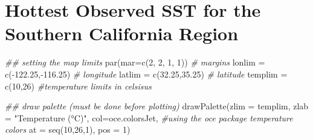 \documentclass[]{tufte-handout}
\newenvironment{Shaded}{}{}
\newcommand{\AttributeTok}[1]{\textcolor[rgb]{0.49,0.56,0.16}{#1}}
\newcommand{\CommentTok}[1]{\textcolor[rgb]{0.38,0.63,0.69}{\textit{#1}}}
\newcommand{\DecValTok}[1]{\textcolor[rgb]{0.25,0.63,0.44}{#1}}
\newcommand{\DocumentationTok}[1]{\textcolor[rgb]{0.73,0.13,0.13}{\textit{#1}}}
\newcommand{\FloatTok}[1]{\textcolor[rgb]{0.25,0.63,0.44}{#1}}
\newcommand{\FunctionTok}[1]{\textcolor[rgb]{0.02,0.16,0.49}{#1}}
\newcommand{\NormalTok}[1]{#1}
\newcommand{\OtherTok}[1]{\textcolor[rgb]{0.00,0.44,0.13}{#1}}
\newcommand{\SpecialCharTok}[1]{\textcolor[rgb]{0.25,0.44,0.63}{#1}}
\newcommand{\StringTok}[1]{\textcolor[rgb]{0.25,0.44,0.63}{#1}}
\begin{document}
\hypertarget{hottest-observed-sst-for-the-southern-california-region}{%
\section{Hottest Observed SST for the Southern California
Region}\label{hottest-observed-sst-for-the-southern-california-region}}

\begin{Shaded}
\begin{Highlighting}[]
\DocumentationTok{\#\# setting the map limits}
\FunctionTok{par}\NormalTok{(}\AttributeTok{mar=}\FunctionTok{c}\NormalTok{(}\DecValTok{2}\NormalTok{, }\DecValTok{2}\NormalTok{, }\DecValTok{1}\NormalTok{, }\DecValTok{1}\NormalTok{)) }\CommentTok{\# margins}
\NormalTok{lonlim }\OtherTok{=} \FunctionTok{c}\NormalTok{(}\SpecialCharTok{{-}}\FloatTok{122.25}\NormalTok{,}\SpecialCharTok{{-}}\FloatTok{116.25}\NormalTok{) }\CommentTok{\# longitude}
\NormalTok{latlim }\OtherTok{=} \FunctionTok{c}\NormalTok{(}\FloatTok{32.25}\NormalTok{,}\FloatTok{35.25}\NormalTok{) }\CommentTok{\# latitude}
\NormalTok{templim }\OtherTok{=} \FunctionTok{c}\NormalTok{(}\DecValTok{10}\NormalTok{,}\DecValTok{26}\NormalTok{) }\CommentTok{\#temperature limits in celsisus}

\DocumentationTok{\#\# draw palette (must be done before plotting)}
\FunctionTok{drawPalette}\NormalTok{(}\AttributeTok{zlim =}\NormalTok{ templim, }
            \AttributeTok{zlab =} \StringTok{"Temperature (°C)"}\NormalTok{,}
            \AttributeTok{col=}\NormalTok{oce.colorsJet, }\CommentTok{\#using the oce package temperature colors}
            \AttributeTok{at =} \FunctionTok{seq}\NormalTok{(}\DecValTok{10}\NormalTok{,}\DecValTok{26}\NormalTok{,}\DecValTok{1}\NormalTok{), }
            \AttributeTok{pos =} \DecValTok{1}\NormalTok{)}


\end{Highlighting}
\end{Shaded}
\end{document}
